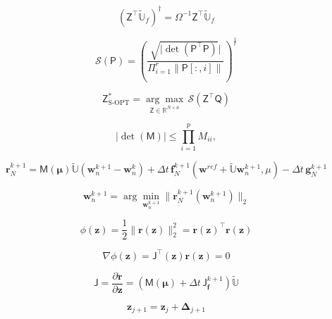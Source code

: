 \documentclass[11pt]{article}
\renewcommand{\vec}[1]{\mathbf{#1}}
\newcommand{\mat}[1]{\mathsf{#1}}
\begin{document}
\begin{equation}
\left(\mat{Z}^{\top}\widetilde{\mathbb{U}}_f\right)^{\dagger} = \Omega^{-1}\mat{Z}^{\top}\widetilde{\mathbb{U}}_f
\label{eq:sopt_error}
\end{equation}

\begin{equation}
    \mathscr{S}(\mat{P}) = \left( \frac{\sqrt{|\det \left( \mat{P}^\top \mat{P}\right)}|} {\Pi_{i=1}^r \|\mat{P}[:,i]\|}\right)^{\frac{1}{r}}
\end{equation}

\begin{equation}
\mat{Z}^*_{\text{S-OPT}} = \underset{\mat{Z}  \in \mathbb{R}^{N \times n}}{\arg\max} \, \mathscr{S}(\mat{Z}^\top \mat{Q})
\label{eq:sopt_max}
\end{equation}

\begin{equation} 
|\det(\mat{M})| \leq \prod_{i=1}^{p} M_{ii}, 
\end{equation}

\begin{equation}
\vec{r}^{k+1}_{N} = \mat{M}(\boldsymbol{\mu})\widetilde{\mathbb{U}}\left(\vec{w}^{k+1}_n-\vec{w}^{k}_n\right) + \Delta t\,\vec{f}^{k+1}_N(\vec{w}^{ref} + \widetilde{\mathbb{U}}\vec{w}^{k+1}_n,\mu) -  \Delta t\,\vec{g}^{k+1}_N
\end{equation}

\begin{equation}
\vec{w}^{k+1}_n = \arg\min_{\mathbf{w}^{k+1}_n} \|\mathbf{r}_N^{k+1}(\vec{w}^{k+1}_n)\|_2
\label{eq:res_min}
\end{equation}

\begin{equation}
\phi(\mathbf{z}) = \frac{1}{2} \|\mathbf{r}(\mathbf{z})\|_2^2 = \mathbf{r}(\mathbf{z})^{\top} \mathbf{r}(\vec{z})
\label{eq:gnat_opt}
\end{equation}

\begin{equation}
\nabla\phi(\vec{z})=\mat{J}^{\top}(\vec{z})\vec{r}(\vec{z}) = 0
\label{eq:Jacobian_res}
\end{equation}

\begin{equation}
\mat{J} = \dfrac{\partial\vec{r}}{\partial \vec{z}} = \left(\mat{M}(\boldsymbol{\mu}) + \Delta t\,\mat{J}^{k+1}_{\vec{f}}\right)\widetilde{\mathbb{U}} 
\label{eq:jacobian}
\end{equation}

\begin{equation}
\vec{z}_{j+1} = \vec{z}_{j} + \boldsymbol{\Delta}_{j+1}
\label{eq:GaussNewton_app}
\end{equation}
\end{document}

